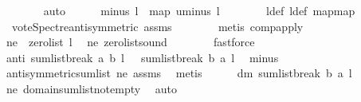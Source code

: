 \begin{isabellebody}
\ \ \ \ \ \ \isamarkupfalse%
\ auto\isanewline
\ \ \ \ \isamarkupfalse%
\ minus{\isacharcolon}{\kern0pt}\ {\isachardoublequoteopen}l{}\ {\isacharequal}{\kern0pt}\ map\ uminus\ l{\isachardoublequoteclose}\isanewline
\ \ \ \ \ \ \isamarkupfalse%
\ l{\isacharunderscore}{\kern0pt}def\ l{}{\isacharunderscore}{\kern0pt}def\ map{\isacharunderscore}{\kern0pt}map\isanewline
\ \ \ \ \ \ \isamarkupfalse%
\ \ vote{\isacharunderscore}{\kern0pt}Spectre{\isacharunderscore}{\kern0pt}antisymmetric\ assms{\isacharparenleft}{\kern0pt}{}{\isacharparenright}{\kern0pt}\isanewline
\ \ \ \ \ \ \isamarkupfalse%
\ {\isacharparenleft}{\kern0pt}metis\ comp{\isacharunderscore}{\kern0pt}apply{\isacharparenright}{\kern0pt}\ \isanewline
\ \ \ \ \isamarkupfalse%
\ \isamarkupfalse%
\ ne{}{}{\isacharcolon}{\kern0pt}\ {\isachardoublequoteopen}{\isasymnot}\ zero{\isacharunderscore}{\kern0pt}list\ l{}{\isachardoublequoteclose}\ \isamarkupfalse%
\ ne{}\ zero{\isacharunderscore}{\kern0pt}list{\isacharunderscore}{\kern0pt}sound\isanewline
\ \ \ \ \ \ \isamarkupfalse%
\ fastforce\ \isanewline
\ \ \ \ \isamarkupfalse%
\ \isamarkupfalse%
\ anti{\isacharcolon}{\kern0pt}\ {\isachardoublequoteopen}sumlist{\isacharunderscore}{\kern0pt}break\ a\ b\ l\ {\isacharequal}{\kern0pt}\ {\isacharminus}{\kern0pt}\ sumlist{\isacharunderscore}{\kern0pt}break\ b\ a\ l{}{\isachardoublequoteclose}\ \isamarkupfalse%
\ minus\ \isanewline
\ \ \ \ \ \ \isamarkupfalse%
\ antisymmetric{\isacharunderscore}{\kern0pt}sumlist\ ne{}\ assms{\isacharparenleft}{\kern0pt}{}{\isacharparenright}{\kern0pt}\ \isamarkupfalse%
\ metis\isanewline
\ \ \ \ \isamarkupfalse%
\ dm{}{\isacharcolon}{\kern0pt}\ {\isachardoublequoteopen}sumlist{\isacharunderscore}{\kern0pt}break\ b\ a\ l{}\ {\isasymin}\ {\isacharbraceleft}{\kern0pt}{\isacharminus}{\kern0pt}{}{\isacharcomma}{\kern0pt}{}{\isacharbraceright}{\kern0pt}{\isachardoublequoteclose}\ \isamarkupfalse%
\ ne{}{}\ domain{\isacharunderscore}{\kern0pt}sumlist{\isacharunderscore}{\kern0pt}not{\isacharunderscore}{\kern0pt}empty\ \isamarkupfalse%
\ auto\isanewline
\ \ \ \ \isamarkupfalse%
\ \isamarkupfalse%

\end{isabellebody}
